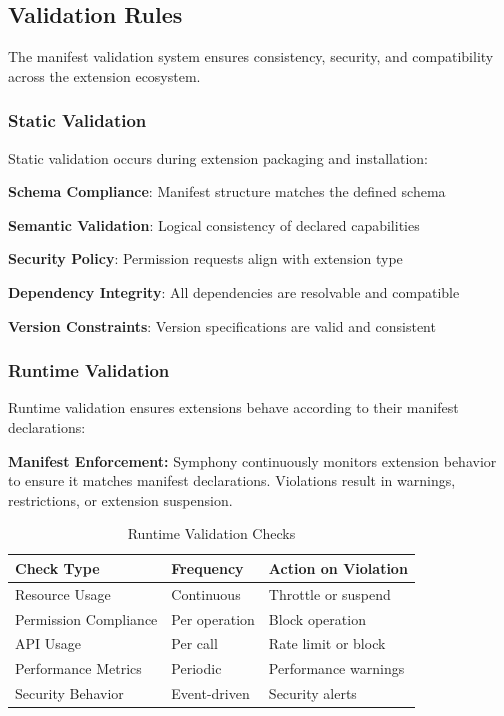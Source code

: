 \subsection{Validation Rules}
\label{subsec:validation-rules}

The manifest validation system ensures consistency, security, and compatibility across the extension ecosystem.

\subsubsection{Static Validation}
\label{subsubsec:static-validation}

Static validation occurs during extension packaging and installation:

\begin{expandedlist}
\item \textbf{Schema Compliance}: Manifest structure matches the defined schema
\item \textbf{Semantic Validation}: Logical consistency of declared capabilities
\item \textbf{Security Policy}: Permission requests align with extension type
\item \textbf{Dependency Integrity}: All dependencies are resolvable and compatible
\item \textbf{Version Constraints}: Version specifications are valid and consistent
\end{expandedlist}

\subsubsection{Runtime Validation}
\label{subsubsec:runtime-validation}

Runtime validation ensures extensions behave according to their manifest declarations:

\begin{alertbox}
\textbf{Manifest Enforcement:} Symphony continuously monitors extension behavior to ensure it matches manifest declarations. Violations result in warnings, restrictions, or extension suspension.
\end{alertbox}

\begin{table}[h]
\centering
\caption{Runtime Validation Checks}
\label{tab:runtime-validation}
\begin{tabular}{@{}lll@{}}
\toprule
\textbf{Check Type} & \textbf{Frequency} & \textbf{Action on Violation} \\
\midrule
Resource Usage & Continuous & Throttle or suspend \\
Permission Compliance & Per operation & Block operation \\
API Usage & Per call & Rate limit or block \\
Performance Metrics & Periodic & Performance warnings \\
Security Behavior & Event-driven & Security alerts \\
\bottomrule
\end{tabular}
\end{table}

